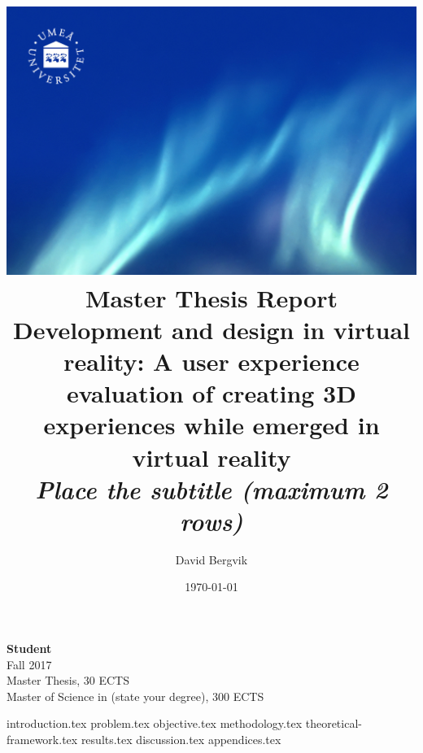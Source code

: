 \documentclass[a4paper,table]{report}
\title{
    \includegraphics[width=1\textwidth]{front.jpg} \\
    \vspace{0.7cm}
     Master Thesis Report\\
    \vspace{0.6cm}
    \LARGE Development and design in virtual reality: A user experience evaluation of creating 3D experiences while emerged in virtual reality \\ %
    \vspace{0.7cm}
    \large\textit{Place the subtitle (maximum 2 rows)}
    \vspace{0.8cm}
}
\author{
    David Bergvik
}
\date{\today}
\begin{document}
\pretitle{\begin{flushleft} \georgia \fontsize{30}{34}\selectfont}
\posttitle{\end{flushleft}}
\preauthor{\begin{flushleft} \georgia \linespread{1.4} \large}
\postauthor{\end{flushleft}}
\predate{} %
\postdate{} %

\maketitle
\vfill
\begin{flushleft}
    \small
    \textbf{Student} \\
    Fall 2017 \\
    Master Thesis, 30 ECTS\\
    Master of Science in (state your degree), 300 ECTS
\end{flushleft}

\thispagestyle{empty}
\restoregeometry
{introduction.tex}
{problem.tex}
{objective.tex}
{methodology.tex}
{theoretical-framework.tex}
{results.tex}
{discussion.tex}
{appendices.tex}
\end{document}
